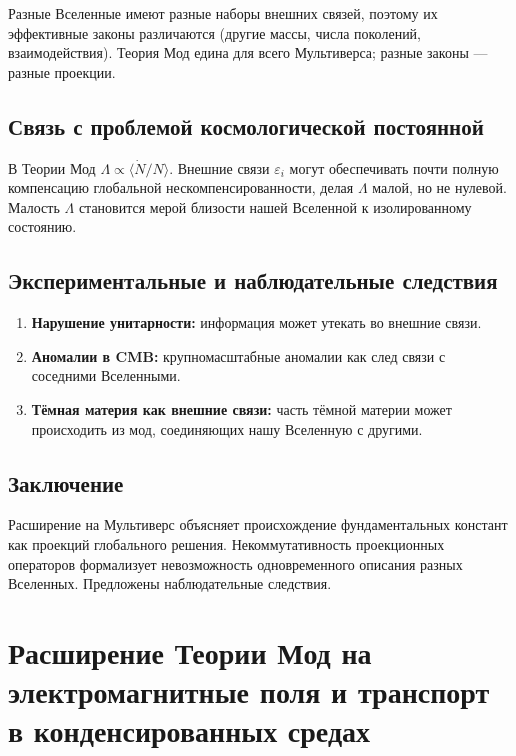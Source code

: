 \documentclass[12pt,a4paper]{article}
\begin{document}
Разные Вселенные имеют разные наборы внешних связей, поэтому их эффективные законы различаются (другие массы, числа поколений, взаимодействия). Теория Мод едина для всего Мультиверса; разные законы --- разные проекции.

\subsection{Связь с проблемой космологической постоянной}
В Теории Мод $\Lambda \propto \langle \dot{N}/N \rangle$. Внешние связи $\varepsilon_i$ могут обеспечивать почти полную компенсацию глобальной нескомпенсированности, делая $\Lambda$ малой, но не нулевой. Малость $\Lambda$ становится мерой близости нашей Вселенной к изолированному состоянию.

\subsection{Экспериментальные и наблюдательные следствия}
\begin{enumerate}[label=(\arabic*)]
    \item \textbf{Нарушение унитарности:} информация может утекать во внешние связи.
    \item \textbf{Аномалии в CMB:} крупномасштабные аномалии как след связи с соседними Вселенными.
    \item \textbf{Тёмная материя как внешние связи:} часть тёмной материи может происходить из мод, соединяющих нашу Вселенную с другими.
\end{enumerate}

\subsection{Заключение}
Расширение на Мультиверс объясняет происхождение фундаментальных констант как проекций глобального решения. Некоммутативность проекционных операторов формализует невозможность одновременного описания разных Вселенных. Предложены наблюдательные следствия.

\newpage
\section{Расширение Теории Мод на электромагнитные поля и транспорт в конденсированных средах}
\end{document}

